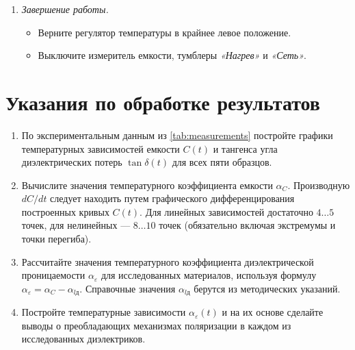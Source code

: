 \begin{enumerate}
    \item \textit{Завершение работы.}
    \begin{itemize}
        \item Верните регулятор температуры в крайнее левое положение.
        \item Выключите измеритель емкости, тумблеры \textit{«Нагрев»} и \textit{«Сеть»}.
    \end{itemize}
\end{enumerate}

\section*{Указания по обработке результатов}
\begin{enumerate}
    \item По экспериментальным данным из \cref{tab:measurements} постройте графики температурных зависимостей емкости $C(t)$ и тангенса угла диэлектрических потерь $\tan \delta(t)$ для всех пяти образцов.
    \item Вычислите значения температурного коэффициента емкости $\alpha_C$. Производную $dC/dt$ следует находить путем графического дифференцирования построенных кривых $C(t)$. Для линейных зависимостей достаточно $4\dots5$ точек, для нелинейных --- $8\dots10$ точек (обязательно включая экстремумы и точки перегиба).
    \item Рассчитайте значения температурного коэффициента диэлектрической проницаемости $\alpha_\varepsilon$ для исследованных материалов, используя формулу $\alpha_\varepsilon = \alpha_C - \alpha_{l\text{д}}$. Справочные значения $\alpha_{l\text{д}}$ берутся из методических указаний.
    \item Постройте температурные зависимости $\alpha_\varepsilon(t)$ и на их основе сделайте выводы о преобладающих механизмах поляризации в каждом из исследованных диэлектриков.
\end{enumerate}